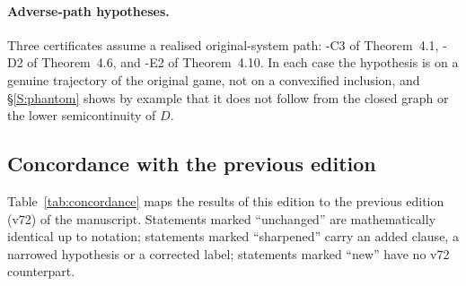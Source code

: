 \paragraph{Adverse-path hypotheses.} Three certificates assume a realised original-system path: \hyp{C3} of Theorem~4.1, \hyp{D2} of Theorem~4.6, and \hyp{E2} of Theorem~4.10. In each case the hypothesis is on a genuine trajectory of the original game, not on a convexified inclusion, and \S\ref{S:phantom} shows by example that it does not follow from the closed graph or the lower semicontinuity of $D$.

\subsection{Concordance with the previous edition}
Table~\ref{tab:concordance} maps the results of this edition to the previous edition (v72) of the manuscript. Statements marked ``unchanged'' are mathematically identical up to notation; statements marked ``sharpened'' carry an added clause, a narrowed hypothesis or a corrected label; statements marked ``new'' have no v72 counterpart.

